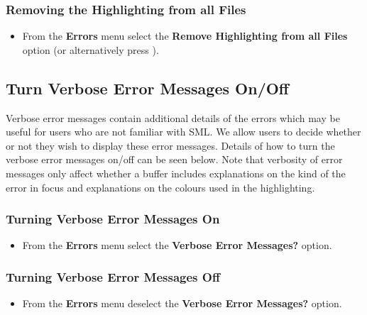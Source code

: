 \documentclass{article}
\begin{document}
\subsubsection{Removing the Highlighting from all Files}

\begin{itemize}
\item From the \textbf{Errors} menu select the \textbf{Remove
  Highlighting from all Files} option (or alternatively press
  ).
\end{itemize}


\subsection{Turn Verbose Error Messages On/Off}

Verbose error messages contain additional details of the errors which
may be useful for users who are not familiar with SML.  We allow users
to decide whether or not they wish to display these error messages.
Details of how to turn the verbose error messages on/off can be seen
below.  Note that verbosity of error messages only affect whether a
buffer includes explanations on the kind of the error in focus and
explanations on the colours used in the highlighting.

\subsubsection{Turning Verbose Error Messages On}

  \begin{itemize}
  \item From the \textbf{Errors}
    menu select the \textbf{Verbose Error Messages?} option.
  \end{itemize}

\subsubsection{Turning Verbose Error Messages Off}

  \begin{itemize}
  \item From the \textbf{Errors} menu
    deselect the \textbf{Verbose Error Messages?} option.
  \end{itemize}
\end{document}
